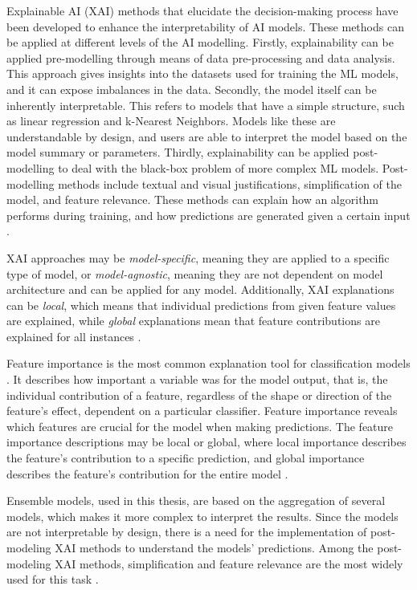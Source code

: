 Explainable AI (XAI) methods that elucidate the decision-making process have been developed to enhance the interpretability of AI models. These methods can be applied at different levels of the AI modelling. Firstly, explainability can be applied pre-modelling through means of data pre-processing and data analysis. This approach gives insights into the datasets used for training the ML models, and it can expose imbalances in the data. Secondly, the model itself can be inherently interpretable. This refers to models that have a simple structure, such as linear regression and k-Nearest Neighbors. Models like these are understandable by design, and users are able to interpret the model based on the model summary or parameters. Thirdly, explainability can be applied post-modelling to deal with the black-box problem of more complex ML models. Post-modelling methods include textual and visual justifications, simplification of the model, and feature relevance. These methods can explain how an algorithm performs during training, and how predictions are generated given a certain input \cite{minh_explainable_2022,angelov_explainable_2021}.

XAI approaches may be \emph{model-specific}, meaning they are applied to a specific type of model, or \emph{model-agnostic}, meaning they are not dependent on model architecture and can be applied for any model. Additionally, XAI explanations can be \emph{local}, which means that individual predictions from given feature values are explained, while \emph{global} explanations mean that feature contributions are explained for all instances \cite{angelov_explainable_2021,salih_perspective_2025}.

Feature importance is the most common explanation tool for classification models \cite{saarela_comparison_2021}. It describes how important a variable was for the model output, that is, the individual contribution of a feature, regardless of the shape or direction of the feature's effect, dependent on a particular classifier. Feature importance reveals which features are crucial for the model when making predictions. The feature importance descriptions may be local or global, where local importance describes the feature's contribution to a specific prediction, and global importance describes the feature's contribution for the entire model \cite{saarela_comparison_2021,angelov_explainable_2021,minh_explainable_2022}.

Ensemble models, used in this thesis, are based on the aggregation of several models, which makes it more complex to interpret the results. Since the models are not interpretable by design, there is a need for the implementation of post-modeling XAI methods to understand the models' predictions. Among the post-modeling XAI methods, simplification and feature relevance are the most widely used for this task \cite{minh_explainable_2022}.

